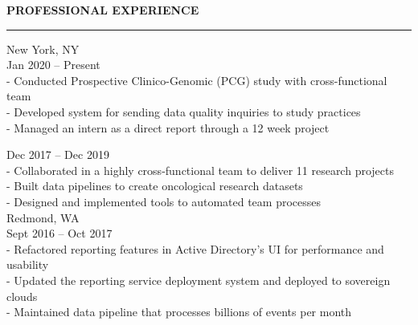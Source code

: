 \documentclass{resume} %
\begin{document}

\medskip
\MakeUppercase{\bf Professional Experience}
\medskip
\hrule

\hspace*{1mm}{\bf Flatiron Health } \hfill New York, NY \\
\hspace*{1mm}{\em Senior Software Engineer, Clinical Research } \hfill Jan 2020 -- Present \\
\hspace*{3mm}- Conducted Prospective Clinico-Genomic (PCG) study with cross-functional team \\
\hspace*{3mm}- Developed system for sending data quality inquiries to study practices \\
\hspace*{3mm}- Managed an intern as a direct report through a 12 week project


\hspace*{1mm}{\em Software Engineer, Real World Evidence } \hfill Dec 2017 -- Dec 2019 \\
\hspace*{3mm}- Collaborated in a highly cross-functional team to deliver 11 research projects \\
\hspace*{3mm}- Built data pipelines to create oncological research datasets \\
\hspace*{3mm}- Designed and implemented tools to automated team processes \\


\hspace*{1mm}{\bf Microsoft } \hfill Redmond, WA \\
\hspace*{1mm}{\em Software Engineer, Azure Active Directory} \hfill Sept 2016 -- Oct 2017 \\
\hspace*{3mm}- Refactored reporting features in Active Directory’s UI for performance and usability \\
\hspace*{3mm}- Updated the reporting service deployment system and deployed to sovereign clouds \\
\hspace*{3mm}- Maintained data pipeline that processes billions of events per month \\
\end{document}
